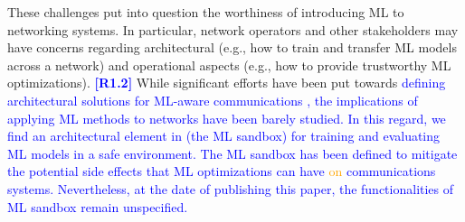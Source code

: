 \documentclass[journal]{IEEEtran}
\begin{document}
	These challenges put into question the worthiness of introducing ML to networking systems. In particular, network operators and other stakeholders may have concerns regarding architectural (e.g., how to train and transfer ML models across a network) and operational aspects (e.g., how to provide trustworthy ML optimizations). \textcolor{blue}{\textbf{[R1.2]}} While significant efforts have been put towards \textcolor{blue}{defining architectural solutions for ML-aware communications \cite{3gpp2019study, ETSI, ITU3172, ITU3174}, the implications of applying ML methods to networks have been barely studied. In this regard, we find an architectural element in \cite{ITU3172} (the ML sandbox) for training and evaluating ML models in a safe environment. The ML sandbox has been defined to mitigate the potential side effects that ML optimizations can have \textcolor{orange}{on} communications systems. Nevertheless, at the date of publishing this paper, the functionalities of ML sandbox remain unspecified.}
\end{document}
